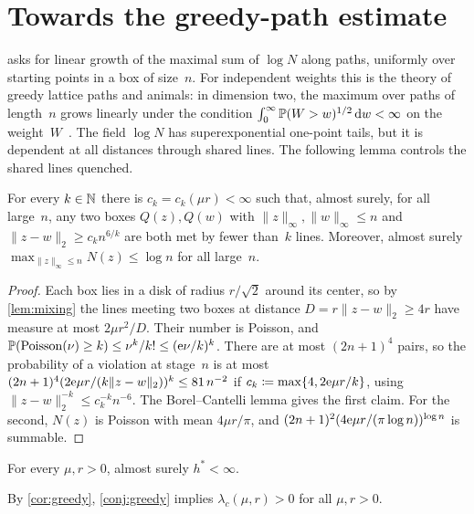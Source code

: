 \documentclass[11pt,letterpaper]{article}
\begin{document}
\section{Towards the greedy-path estimate}
\label{sec:greedy}

 asks for linear growth of the maximal sum of $\log N$ along paths, uniformly over starting points in a box of size~$n$. For independent weights this is the theory of greedy lattice paths and animals: in dimension two, the maximum over paths of length~$n$ grows linearly under the condition $\int_0^\infty\mathbb P(W>w)^{1/2}\,\mathrm{d} w<\infty$ on the weight~$W$~\cite{CGGK93,Mar02}. The field $\log N$ has superexponential one-point tails, but it is dependent at all distances through shared lines. The following lemma controls the shared lines quenched.

\begin{lemma}
\label{lem:shared}
For every $k\in\mathbb N$ there is $c_k=c_k(\mu r)<\infty$ such that, almost surely, for all large~$n$, any two boxes $Q(z),Q(w)$ with $\lVert z\rVert_\infty,\lVert w\rVert_\infty\le n$ and $\lVert z-w\rVert_2\ge c_kn^{6/k}$ are both met by fewer than~$k$ lines. Moreover, almost surely $\max_{\lVert z\rVert_\infty\le n}N(z)\le\log n$ for all large~$n$.
\end{lemma}

\begin{proof}
Each box lies in a disk of radius $r/\sqrt2$ around its center, so by \cref{lem:mixing} the lines meeting two boxes at distance $D=r\lVert z-w\rVert_2\ge4r$ have measure at most $2\mu r^2/D$. Their number is Poisson, and $\mathbb P(\mathrm{Poisson}(\nu)\ge k)\le\nu^k/k!\le(\mathrm{e}\nu/k)^k$. There are at most $(2n+1)^4$ pairs, so the probability of a violation at stage~$n$ is at most $(2n+1)^4(2\mathrm{e}\mu r/(k\lVert z-w\rVert_2))^k\le81\,n^{-2}$ if $c_k\coloneqq\max\{4,2\mathrm{e}\mu r/k\}$, using $\lVert z-w\rVert_2^{-k}\le c_k^{-k}n^{-6}$. The Borel--Cantelli lemma gives the first claim. For the second, $N(z)$ is Poisson with mean $4\mu r/\pi$, and $(2n+1)^2(4\mathrm{e}\mu r/(\pi\log n))^{\log n}$ is summable.
\end{proof}

\begin{conjecture}
\label{conj:greedy}
For every $\mu,r>0$, almost surely $h^*<\infty$.
\end{conjecture}

By \cref{cor:greedy}, \cref{conj:greedy} implies $\lambda_c(\mu,r)>0$ for all $\mu,r>0$.
\end{document}
